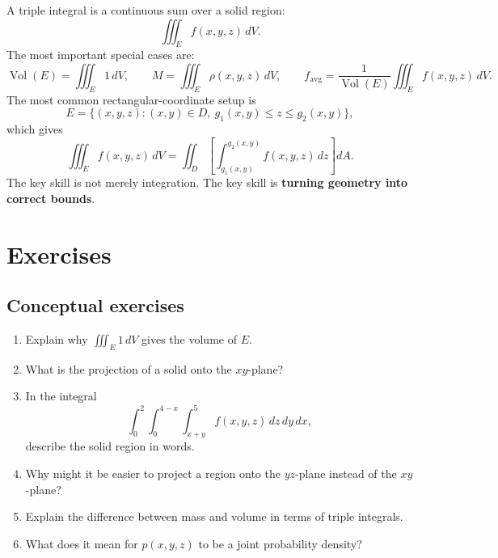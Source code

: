 \documentclass[11pt]{article}
\newcommand{\Vol}{\operatorname{Vol}}
\newcommand{\avg}{\operatorname{avg}}
\begin{document}
A triple integral is a continuous sum over a solid region:
\[
\iiint_E f(x,y,z)\,dV.
\]
The most important special cases are:
\[
\Vol(E)=\iiint_E1\,dV,
\qquad
M=\iiint_E\rho(x,y,z)\,dV,
\qquad
f_{\avg}=\frac{1}{\Vol(E)}\iiint_E f(x,y,z)\,dV.
\]
The most common rectangular-coordinate setup is
\[
E=\{(x,y,z):(x,y)\in D,\ g_1(x,y)\le z\le g_2(x,y)\},
\]
which gives
\[
\iiint_E f(x,y,z)\,dV
=\iint_D\left[\int_{g_1(x,y)}^{g_2(x,y)} f(x,y,z)\,dz\right]dA.
\]
The key skill is not merely integration. The key skill is \textbf{turning geometry into correct bounds}.

\section*{Exercises}

\subsection*{Conceptual exercises}
\begin{enumerate}
  \item Explain why $\iiint_E1\,dV$ gives the volume of $E$.
  \item What is the projection of a solid onto the $xy$-plane?
  \item In the integral
  \[
  \int_0^2\int_0^{4-x}\int_{x+y}^{5}f(x,y,z)\,dz\,dy\,dx,
  \]
  describe the solid region in words.
  \item Why might it be easier to project a region onto the $yz$-plane instead of the $xy$-plane?
  \item Explain the difference between mass and volume in terms of triple integrals.
  \item What does it mean for $p(x,y,z)$ to be a joint probability density?
\end{enumerate}
\end{document}
